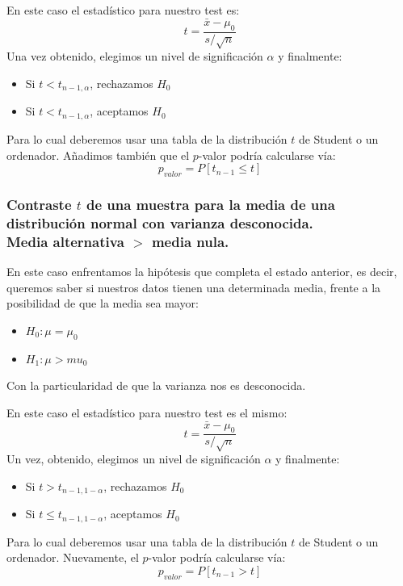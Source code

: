 \documentclass[a4paper,12pt]{article}
\begin{document}
 En este caso el estadístico para nuestro test es: 
 $$t=\frac{\bar{x}-\mu_0}{s/\sqrt{n}}$$
 Una vez obtenido, elegimos un nivel de significación $\alpha$ y finalmente:
 \begin{itemize}
 	\item Si $t<t_{n-1,\alpha}$, rechazamos $H_0$
 	\item Si $t<t_{n-1,\alpha}$, aceptamos $H_0$
 \end{itemize}
 Para lo cual deberemos usar una tabla de la distribución $t$ de Student o un ordenador.
 Añadimos también que el $p$-valor podría calcularse vía:
 $$p_{valor}=P[t_{n-1}\leq t]$$
 
 \subsubsection{Contraste $t$ de una muestra para la media de una distribución normal con varianza desconocida. \\ Media alternativa $>$ media nula.}
 En este caso enfrentamos la hipótesis que completa el estado anterior, es decir, queremos saber si nuestros datos tienen una determinada media, frente a la posibilidad  de que la media sea mayor: 
 \begin{itemize}
 	\item $H_0:\mu=\mu_0$
 	\item $H_1: \mu>mu_0$
 \end{itemize}
 Con la particularidad de que la varianza nos es desconocida.
 
 En este caso el estadístico para nuestro test es el mismo: 
 $$t=\frac{\bar{x}-\mu_0}{s/\sqrt{n}}$$
 Un vez, obtenido, elegimos un nivel de significación $\alpha$ y finalmente:
 \begin{itemize}
 	\item Si $t>t_{n-1,1-\alpha}$, rechazamos $H_0$
 	\item Si $t\leq t_{n-1,1-\alpha}$, aceptamos $H_0$
 \end{itemize}
 Para lo cual deberemos usar una tabla de la distribución $t$ de Student o un ordenador.
 Nuevamente, el $p$-valor podría calcularse vía:
 $$p_{valor}=P[t_{n-1}> t]$$
 
\end{document}

